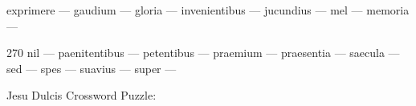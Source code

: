 \documentclass[12pt]{article}
\begin{document}
\pagestyle{fancy}
\fancyhf{}
\renewcommand{\headrulewidth}{0pt}
\renewcommand{\footrulewidth}{0pt}
\libertine
\renewcommand\PuzzleClueFont{\rm\normalsize}
\noindent\begin{rotate}{0}
\small
\qquad exprimere --- gaudium --- gloria --- invenientibus --- jucundius --- mel --- memoria --- 
\end{rotate}
\hfill
\begin{rotate}{270}
\small
\qquad nil --- paenitentibus --- petentibus --- praemium --- praesentia --- saecula --- sed --- spes --- suavius --- super --- 
\end{rotate}
\begin{center}
  \huge{Jesu Dulcis Crossword Puzzle:}
\end{center}
\vspace{1.5cm}
\end{document}
